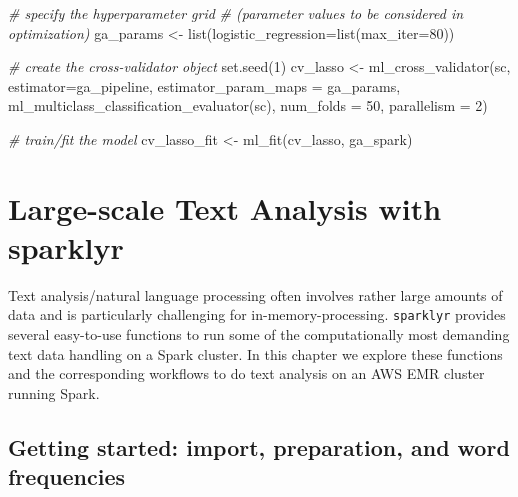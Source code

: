 \documentclass[
  12pt,
]{style/krantz}
\newenvironment{Shaded}{\begin{snugshade}}{\end{snugshade}}
\newcommand{\AttributeTok}[1]{\textcolor[rgb]{0.77,0.63,0.00}{#1}}
\newcommand{\CommentTok}[1]{\textcolor[rgb]{0.56,0.35,0.01}{\textit{#1}}}
\newcommand{\DecValTok}[1]{\textcolor[rgb]{0.00,0.00,0.81}{#1}}
\newcommand{\FunctionTok}[1]{\textcolor[rgb]{0.00,0.00,0.00}{#1}}
\newcommand{\NormalTok}[1]{#1}
\newcommand{\OtherTok}[1]{\textcolor[rgb]{0.56,0.35,0.01}{#1}}
\begin{document}
\begin{Shaded}
\begin{Highlighting}[]
\CommentTok{\# specify the hyperparameter grid}
\CommentTok{\# (parameter values to be considered in optimization)}
\NormalTok{ga\_params }\OtherTok{\textless{}{-}} \FunctionTok{list}\NormalTok{(}\AttributeTok{logistic\_regression=}\FunctionTok{list}\NormalTok{(}\AttributeTok{max\_iter=}\DecValTok{80}\NormalTok{))}

\CommentTok{\# create the cross{-}validator object}
\FunctionTok{set.seed}\NormalTok{(}\DecValTok{1}\NormalTok{)}
\NormalTok{cv\_lasso }\OtherTok{\textless{}{-}} \FunctionTok{ml\_cross\_validator}\NormalTok{(sc,}
                         \AttributeTok{estimator=}\NormalTok{ga\_pipeline,}
                         \AttributeTok{estimator\_param\_maps =}\NormalTok{ ga\_params,}
                         \FunctionTok{ml\_multiclass\_classification\_evaluator}\NormalTok{(sc),}
                         \AttributeTok{num\_folds =} \DecValTok{50}\NormalTok{, }
                         \AttributeTok{parallelism =} \DecValTok{2}\NormalTok{)}

\CommentTok{\# train/fit the model}
\NormalTok{cv\_lasso\_fit }\OtherTok{\textless{}{-}} \FunctionTok{ml\_fit}\NormalTok{(cv\_lasso, ga\_spark)}
\end{Highlighting}
\end{Shaded}

\hypertarget{large-scale-text-analysis-with-sparklyr}{%
\chapter{Large-scale Text Analysis with sparklyr}\label{large-scale-text-analysis-with-sparklyr}}

Text analysis/natural language processing often involves rather large amounts of data and is particularly challenging for in-memory-processing. \texttt{sparklyr} provides several easy-to-use functions to run some of the computationally most demanding text data handling on a Spark cluster. In this chapter we explore these functions and the corresponding workflows to do text analysis on an AWS EMR cluster running Spark.

\hypertarget{getting-started-import-preparation-and-word-frequencies}{%
\section{Getting started: import, preparation, and word frequencies}\label{getting-started-import-preparation-and-word-frequencies}}
\end{document}

